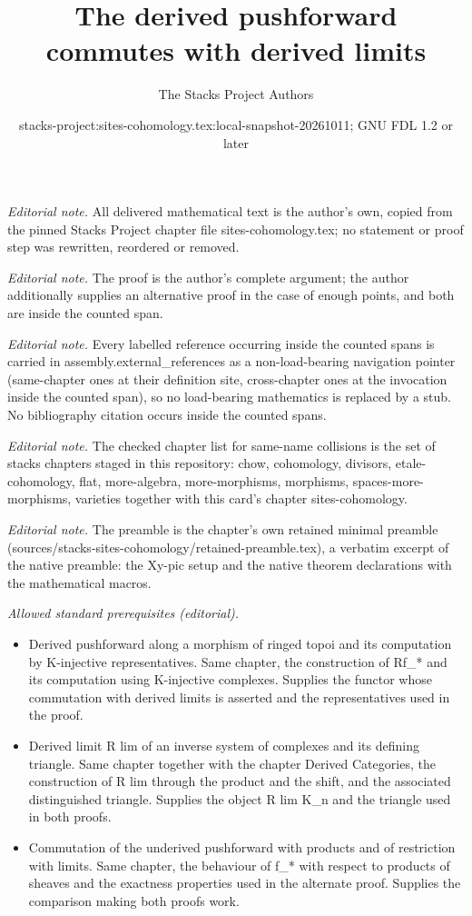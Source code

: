 \documentclass[10pt,a4paper]{amsart}
\title{The derived pushforward commutes with derived limits}
\author{The Stacks Project Authors}
\date{stacks-project:sites-cohomology.tex:local-snapshot-20261011; GNU FDL 1.2 or later}
\theoremstyle{plain}
\theoremstyle{definition}
\theoremstyle{remark}
\numberwithin{equation}{subsection}
\begin{document}
\maketitle
\noindent\textit{Editorial note.} All delivered mathematical text is the author's own, copied from the pinned Stacks Project chapter file sites-cohomology.tex; no statement or proof step was rewritten, reordered or removed.\par\medskip
\noindent\textit{Editorial note.} The proof is the author's complete argument; the author additionally supplies an alternative proof in the case of enough points, and both are inside the counted span.\par\medskip
\noindent\textit{Editorial note.} Every labelled reference occurring inside the counted spans is carried in assembly.external\_references as a non-load-bearing navigation pointer (same-chapter ones at their definition site, cross-chapter ones at the invocation inside the counted span), so no load-bearing mathematics is replaced by a stub. No bibliography citation occurs inside the counted spans.\par\medskip
\noindent\textit{Editorial note.} The checked chapter list for same-name collisions is the set of stacks chapters staged in this repository: chow, cohomology, divisors, etale-cohomology, flat, more-algebra, more-morphisms, morphisms, spaces-more-morphisms, varieties together with this card's chapter sites-cohomology.\par\medskip
\noindent\textit{Editorial note.} The preamble is the chapter's own retained minimal preamble (sources/stacks-sites-cohomology/retained-preamble.tex), a verbatim excerpt of the native preamble: the Xy-pic setup and the native theorem declarations with the mathematical macros.\par\medskip
\noindent\textit{Allowed standard prerequisites (editorial).}\begin{itemize}
\item Derived pushforward along a morphism of ringed topoi and its computation by K-injective representatives. Same chapter, the construction of Rf\_* and its computation using K-injective complexes. Supplies the functor whose commutation with derived limits is asserted and the representatives used in the proof.
\item Derived limit R lim of an inverse system of complexes and its defining triangle. Same chapter together with the chapter Derived Categories, the construction of R lim through the product and the shift, and the associated distinguished triangle. Supplies the object R lim K\_n and the triangle used in both proofs.
\item Commutation of the underived pushforward with products and of restriction with limits. Same chapter, the behaviour of f\_* with respect to products of sheaves and the exactness properties used in the alternate proof. Supplies the comparison making both proofs work.
\end{itemize}\medskip
\end{document}
